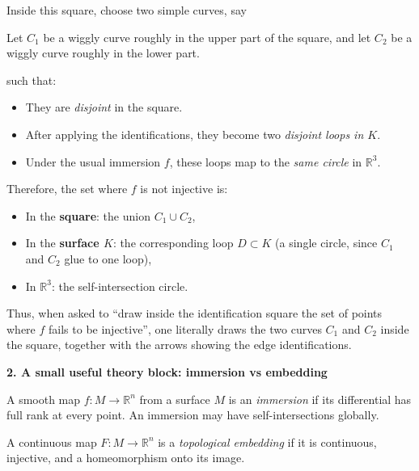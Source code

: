 \begin{solution}
Inside this square, choose two simple curves, say

Let \(C_1\) be a wiggly curve roughly in the upper part of the square, and let
\(C_2\) be a wiggly curve roughly in the lower part.

such that:

\begin{itemize}
	\item They are \emph{disjoint} in the square.
	\item After applying the identifications, they become two \emph{disjoint loops in $K$}.
	\item Under the usual immersion $f$, these loops map to the \emph{same circle} in $\mathbb{R}^3$.
\end{itemize}

Therefore, the set where $f$ is not injective is:

\begin{itemize}
	\item In the \textbf{square}: the union $C_1\cup C_2$,
	\item In the \textbf{surface $K$}: the corresponding loop $D\subset K$ (a single circle, since $C_1$ and $C_2$ glue to one loop),
	\item In \textbf{$\mathbb{R}^3$}: the self-intersection circle.
\end{itemize}

Thus, when asked to ``draw inside the identification square the set of points where $f$ fails to be injective'', one literally draws the two curves $C_1$ and $C_2$ inside the square, together with the arrows showing the edge identifications.

\bigskip

\par\medskip\noindent\textbf{2. A small useful theory block: immersion vs embedding}\par\smallskip


\begin{definition}[Immersion]
	A smooth map $f : M \to \mathbb{R}^n$ from a surface $M$ is an \emph{immersion}
	if its differential has full rank at every point.  
	An immersion may have self-intersections globally.
\end{definition}

\begin{definition}[Embedding]
	A continuous map $F : M \to \mathbb{R}^n$ is a \emph{topological embedding}
	if it is continuous, injective, and a homeomorphism onto its image.
\end{definition}


\end{solution}
